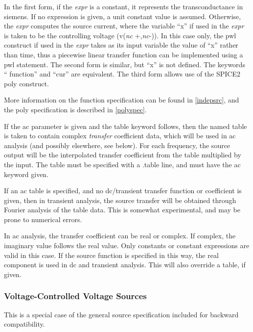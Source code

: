 In the first form, if the {\it expr} is a constant, it represents the
transconductance in siemens.  If no expression is given, a unit
constant value is assumed.  Otherwise, the {\it expr} computes the
source current, where the variable ``{\vt x}'' if used in the {\it
expr} is taken to be the controlling voltage (v({\it nc\/}{\vt
+},{\it nc\/}{\vt -})).  In this case only, the {\vt pwl} construct
if used in the {\it expr} takes as its input variable the value of
``{\vt x}'' rather than time, thus a piecewise linear transfer
function can be implemented using a {\vt pwl} statement.  The second
form is similar, but ``{\vt x}'' is not defined.  The keywords ``{\vt
function}'' and ``{\vt cur}'' are equivalent.  The third form allows
use of the SPICE2 {\vt poly} construct.

More information on the function specification can be found in
\ref{indepsrc}, and the {\vt poly} specification is described in
\ref{polyspec}.

If the {\vt ac} parameter is given and the {\vt table} keyword
follows, then the named table is taken to contain complex {\it
transfer} coefficient data, which will be used in ac analysis (and
possibly elsewhere, see below).  For each frequency, the source output
will be the interpolated transfer coefficient from the table
multiplied by the input.  The table must be specified with a {\vt
.table} line, and must have the {\vt ac} keyword given.

If an ac table is specified, and no dc/transient transfer function or
coefficient is given, then in transient analysis, the source transfer
will be obtained through Fourier analysis of the table data.  This is
somewhat experimental, and may be prone to numerical errors.

In ac analysis, the transfer coefficient can be real or complex.  If
complex, the imaginary value follows the real value.  Only constants
or constant expressions are valid in this case.  If the source
function is specified in this way, the real component is used in dc
and transient analysis.  This will also override a table, if given.

\subsubsection{Voltage-Controlled Voltage Sources}


This is a special case of the general source specification included
for backward compatibility.

